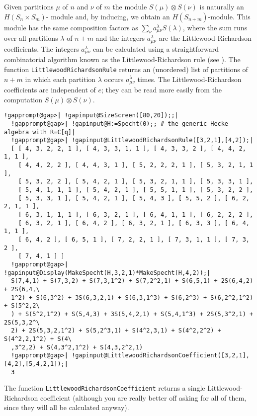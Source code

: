 \documentclass[a4paper,11pt]{report}
\begin{document}
{{{ Given partitions $\mu$ of $n$ and $\nu$ of $m$ the module $S(\mu)\otimes S(\nu)$ is naturally an $H(S_n\times S_m)$- module and, by inducing, we obtain an $H(S_{n+m})$-module. This module has the same composition factors as $\sum_{\nu} a_{\mu\nu}^\lambda S(\lambda)$, where the sum runs over all partitions $\lambda$ of $n+m$ and the integers $a_{\mu\nu}^\lambda$ are the Littlewood-Richardson coefficients. The integers $a_{\mu\nu}^\lambda$ can be calculated using a straightforward combinatorial algorithm known as the
Littlewood-Richardson rule (see \cite{JK}). The function \texttt{LittlewoodRichardsonRule} returns an (unordered) list of partitions of $n+m$ in which each partition $\lambda$ occurs $a_{\mu\nu}^\lambda$ times. The Littlewood-Richardson coefficients are independent of $e$; they can be read more easily from the computation $S(\mu)\otimes S(\nu)$. 
\begin{Verbatim}[commandchars=!@|,fontsize=\small,frame=single,label=Example]
  !gapprompt@gap>| !gapinput@SizeScreen([80,20]);;|
  !gapprompt@gap>| !gapinput@H:=Specht(0);; # the generic Hecke algebra with R=C[q]|
  !gapprompt@gap>| !gapinput@LittlewoodRichardsonRule([3,2,1],[4,2]);|
  [ [ 4, 3, 2, 2, 1 ], [ 4, 3, 3, 1, 1 ], [ 4, 3, 3, 2 ], [ 4, 4, 2, 1, 1 ],
    [ 4, 4, 2, 2 ], [ 4, 4, 3, 1 ], [ 5, 2, 2, 2, 1 ], [ 5, 3, 2, 1, 1 ],
    [ 5, 3, 2, 2 ], [ 5, 4, 2, 1 ], [ 5, 3, 2, 1, 1 ], [ 5, 3, 3, 1 ],
    [ 5, 4, 1, 1, 1 ], [ 5, 4, 2, 1 ], [ 5, 5, 1, 1 ], [ 5, 3, 2, 2 ],
    [ 5, 3, 3, 1 ], [ 5, 4, 2, 1 ], [ 5, 4, 3 ], [ 5, 5, 2 ], [ 6, 2, 2, 1, 1 ],
    [ 6, 3, 1, 1, 1 ], [ 6, 3, 2, 1 ], [ 6, 4, 1, 1 ], [ 6, 2, 2, 2 ],
    [ 6, 3, 2, 1 ], [ 6, 4, 2 ], [ 6, 3, 2, 1 ], [ 6, 3, 3 ], [ 6, 4, 1, 1 ],
    [ 6, 4, 2 ], [ 6, 5, 1 ], [ 7, 2, 2, 1 ], [ 7, 3, 1, 1 ], [ 7, 3, 2 ],
    [ 7, 4, 1 ] ]
  !gapprompt@gap>| !gapinput@Display(MakeSpecht(H,3,2,1)*MakeSpecht(H,4,2));|
  S(7,4,1) + S(7,3,2) + S(7,3,1^2) + S(7,2^2,1) + S(6,5,1) + 2S(6,4,2) + 2S(6,4,\
  1^2) + S(6,3^2) + 3S(6,3,2,1) + S(6,3,1^3) + S(6,2^3) + S(6,2^2,1^2) + S(5^2,2\
  ) + S(5^2,1^2) + S(5,4,3) + 3S(5,4,2,1) + S(5,4,1^3) + 2S(5,3^2,1) + 2S(5,3,2^\
  2) + 2S(5,3,2,1^2) + S(5,2^3,1) + S(4^2,3,1) + S(4^2,2^2) + S(4^2,2,1^2) + S(4\
  ,3^2,2) + S(4,3^2,1^2) + S(4,3,2^2,1)
  !gapprompt@gap>| !gapinput@LittlewoodRichardsonCoefficient([3,2,1],[4,2],[5,4,2,1]);|
  3
\end{Verbatim}
 The function \texttt{LittlewoodRichardsonCoefficient} returns a single Littlewood-Richardson coefficient (although you are really
better off asking for all of them, since they will all be calculated anyway).

}}}
\end{document}
